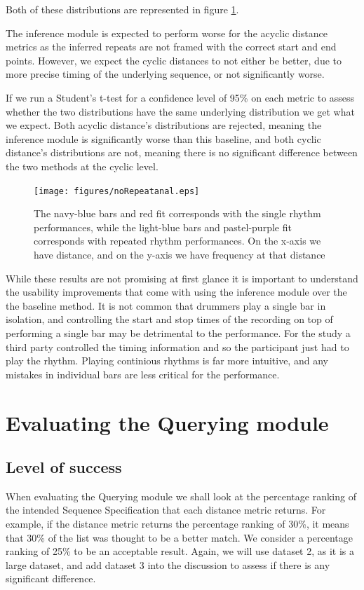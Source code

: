 \documentclass[12pt,twoside,notitlepage]{report}
\begin{document}
		Both of these distributions are represented in figure \ref{fig:NoRepeatsAnalays}. 
		
		The inference module is expected to perform worse for the acyclic distance metrics as the inferred repeats are not framed with the correct start and end points. However, we expect the cyclic distances to not either be better, due to more precise timing of the underlying sequence, or not significantly worse.
		
		If we run a Student's t-test for a confidence level of 95\% on each metric to assess whether the two distributions have the same underlying distribution we get what we expect. Both acyclic distance's distributions are rejected, meaning the inference module is significantly worse than this baseline, and both cyclic distance's distributions are not, meaning there is no significant difference between the two methods at the cyclic level.

\begin{figure}[h]
			\centerline{\texttt{[image: figures/noRepeatanal.eps]}}
			\caption{\label{fig:NoRepeatsAnalays} The navy-blue bars and red fit corresponds with the single rhythm performances, while the light-blue bars and pastel-purple fit corresponds with repeated rhythm performances. On the x-axis we have distance, and on the y-axis we have frequency at that distance}
\end{figure}

		While these results are not promising at first glance it is important to understand the usability improvements that come with using the inference module over the the baseline method. It is not common that drummers play a single bar in isolation, and controlling the start and stop times of the recording on top of performing a single bar may be detrimental to the performance. For the study a third party controlled the timing information and so the participant just had to play the rhythm. Playing continious rhythms is far more intuitive, and any mistakes in individual bars are less critical for the performance.
		
		

	\section{Evaluating the Querying module}\label{sec:Eval Query}
		\subsection{Level of success}
		When evaluating the Querying module we shall look at the percentage ranking of the intended Sequence Specification that each distance metric returns. For example, if the distance metric returns the percentage ranking of 30\%, it means that 30\% of the list was thought to be a better match. We consider a percentage ranking of 25\% to be an acceptable result. Again, we will use dataset 2, as it is a large dataset, and add dataset 3 into the discussion to assess if there is any significant difference.
		
\end{document}
